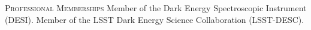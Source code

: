 \begin{rubric}{\faGlobe \textsc{Professional 
Memberships}}
\entry*[]
	Member of the Dark Energy Spectroscopic Instrument (DESI).
\entry*[]
	Member of the LSST Dark Energy Science Collaboration (LSST-DESC).
\end{rubric}
